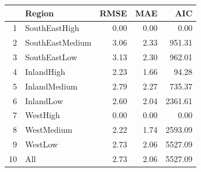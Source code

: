 \documentclass[a4paper,11pt,twoside]{report}
\begin{document}
\begin{table}[ht]
\centering
{} \label{tab:Other species} 
\begin{tabular}{rlrrr}
  \hline
 & Region & RMSE & MAE & AIC \\ 
  \hline
1 & SouthEastHigh & 0.00 & 0.00 & 0.00 \\ 
  2 & SouthEastMedium & 3.06 & 2.33 & 951.31 \\ 
  3 & SouthEastLow & 3.13 & 2.30 & 962.01 \\ 
  4 & InlandHigh & 2.23 & 1.66 & 94.28 \\ 
  5 & InlandMedium & 2.79 & 2.27 & 735.37 \\ 
  6 & InlandLow & 2.60 & 2.04 & 2361.61 \\ 
  7 & WestHigh & 0.00 & 0.00 & 0.00 \\ 
  8 & WestMedium & 2.22 & 1.74 & 2593.09 \\ 
  9 & WestLow & 2.73 & 2.06 & 5527.09 \\ 
  10 & All & 2.73 & 2.06 & 5527.09 \\ 
   \hline
\end{tabular}
\end{table}


\end{document}
